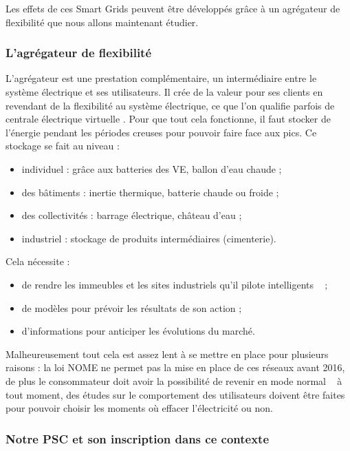 			Les effets de ces Smart Grids peuvent être développés grâce à un agrégateur de flexibilité que nous allons maintenant étudier.
		
		
		\subsubsection{L'agrégateur de flexibilité}
		
			L’agrégateur est une prestation complémentaire, un intermédiaire entre le système électrique et ses utilisateurs. Il crée de la valeur pour ses clients en revendant de la flexibilité au système électrique, ce que l'on qualifie parfois de \og centrale électrique virtuelle \fg. Pour que tout cela fonctionne, il faut stocker de l’énergie pendant les périodes creuses pour pouvoir faire face aux pics. Ce stockage se fait au niveau :
			
			\begin{itemize}
				\item individuel : grâce aux batteries des VE, ballon d'eau chaude ;
				\item des bâtiments : inertie thermique, batterie chaude ou froide ;
				\item des collectivités : barrage électrique, château d'eau ;
				\item industriel : stockage de produits intermédiaires (cimenterie).
			\end{itemize}
			
			Cela nécessite :
	
			\begin{itemize}
				\item de rendre les immeubles et  les sites industriels qu'il pilote \og intelligents \fg~ ;
				\item de modèles pour prévoir les résultats de son action ;
				\item d'informations pour anticiper les évolutions du marché.
			\end{itemize}
			
			Malheureusement tout cela est assez lent à se mettre en place pour plusieurs raisons : la loi NOME ne permet pas la mise en place de ces réseaux avant 2016, de plus le consommateur doit avoir la possibilité de revenir en mode \og normal \fg~ à tout moment, des études sur le comportement des utilisateurs doivent être faites pour pouvoir choisir les moments où effacer l’électricité ou non.
	
		\subsubsection{Notre PSC et son inscription dans ce contexte}
		
